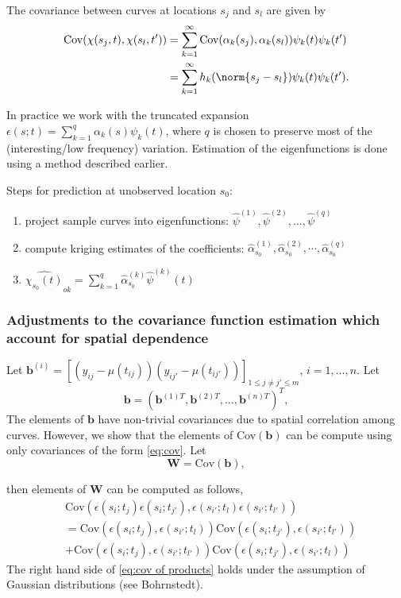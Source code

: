 \begin{frame}
The covariance between curves at locations $s_j$ and $s_l$ are given by 
\begin{align}
	\text{Cov}(\chi(s_j,t), \chi(s_l, t')) &= \sum_{k=1}^{\infty}\text{Cov}(\alpha_k(s_j), \alpha_k(s_l))\psi_k(t)\psi_k(t')\\
	&= \sum_{k=1}^{\infty}h_k(\norm{s_j-s_l})\psi_k(t)\psi_k(t'). 
	\label{eq:cov}
\end{align}

In practice we work with the truncated expansion $\epsilon(s;t) = \sum_{k=1}^{q} \alpha_k(s)\psi_k(t)$, where $q$ is chosen to preserve most of the (interesting/low frequency) variation. Estimation of the eigenfunctions is done using a method described earlier.
\end{frame}


\frame
{
Steps for prediction at unobserved location $s_0$:
\begin{enumerate}
\item project sample curves into eigenfunctions: $\hat{\psi}^{(1)}, \hat{\psi}^{(2)}, \dots, \hat{\psi}^{(q)}$ 
\item compute kriging estimates of the coefficients: $\hat{\alpha}_{s_0}^{(1)}, \hat{\alpha}_{s_0}^{(2)}, \cdots, \hat{\alpha}_{s_0}^{(q)}$ 
\item $\widehat{\chi_{s_0}(t)}_{ok} = \sum_{k=1}^{q} \hat{\alpha}_{s_0}^{(k)}\hat{\psi}^{(k)}(t)$
\end{enumerate}

}


\begin{frame}
\frametitle{Adjustments to the covariance function estimation which account for spatial dependence}

Let $\mathbf{b}^{(i)} = [(y_{ij}-\mu(t_{ij}))(y_{ij'}-\mu(t_{ij'}))]_{1\leq j\neq j'\leq m}$, $i=1, \dots, n$. Let
\[
\mathbf{b} = (\mathbf{b}^{(1)T}, \mathbf{b}^{(2)T}, \dots, \mathbf{b}^{(n)T}   )^T,
\]
 The elements of $\mathbf{b}$ have non-trivial covariances due to spatial correlation among curves. However, we show that the elements of Cov$(\mathbf{b})$ can be compute using only covariances of the form \eqref{eq:cov}. Let
\[
\mathbf{W}= \text{Cov}(\mathbf{b}), 
\]

then elements of $\mathbf{W}$ can be computed as follows,
\begin{align} 
	&\text{Cov}(\epsilon(s_i; t_{j}) \epsilon(s_i;t_{j'}), \epsilon(s_{i'}; t_{l}) \epsilon(s_{i'};t_{l'}) ) \nonumber\\
	&= 
	  \text{Cov}(\epsilon(s_i; t_{j}), \epsilon(s_{i'}; t_{l}))\text{Cov}( \epsilon(s_i;t_{j'}), \epsilon(s_{i'};t_{l'})  ) \nonumber \\
	&+
		 \text{Cov}(\epsilon(s_i; t_{j}),  \epsilon(s_{i'};t_{l'}) )\text{Cov}(\epsilon(s_i;t_{j'}), \epsilon(s_{i'}; t_{l})) \label{eq:cov of products}
\end{align}
The right hand side of \eqref{eq:cov of products} holds under the assumption of Gaussian distributions (see Bohrnstedt). 
\end{frame}

